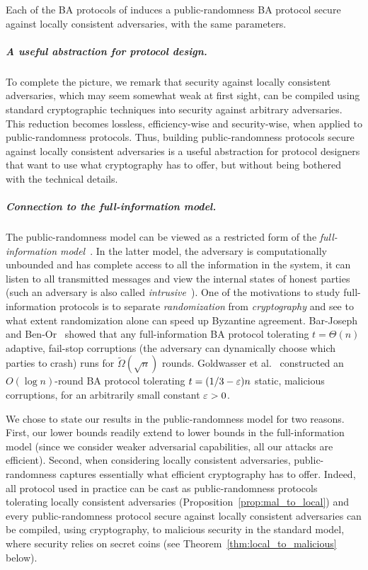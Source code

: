 \begin{proposition}\label{prop:mal_to_local}
Each of the BA protocols of \cite{FM97,FG03,KK06,Micali17,SM16,MV17,ADDNR19,ACDNPRS19} induces a public-randomness BA protocol secure against locally consistent adversaries, with the same parameters.
\end{proposition}


\subparagraph{A useful abstraction for protocol design.}
To complete the picture, we remark that security against locally consistent adversaries, which may seem somewhat weak at first sight, can be compiled using standard cryptographic techniques into security against arbitrary adversaries. This reduction becomes lossless, efficiency-wise and security-wise, when applied to public-randomness protocols. Thus, building public-randomness protocols secure against locally consistent adversaries is a useful abstraction for protocol designers that want to use what cryptography has to offer, but without being bothered with the technical details.

\subparagraph{Connection to the full-information model.}
The public-randomness model can be viewed as a restricted form of the \emph{full-information model}~\cite{CC84,BL85,GGL98,BB98,BPV06,GPV06,KKKSS08,Lewko11,KS13,LL13}. In the latter model, the adversary is computationally unbounded and has complete access to all the information in the system, \ie it can listen to all transmitted messages and view the internal states of honest parties (such an adversary is also called \emph{intrusive}~\cite{CC84}). One of the motivations to study full-information protocols is to separate \emph{randomization} from \emph{cryptography} and see to what extent randomization alone can speed up Byzantine agreement. Bar-Joseph and Ben-Or~\cite{BB98} showed that any full-information BA protocol tolerating $t=\Theta(n)$ adaptive, fail-stop corruptions (\ie the adversary can dynamically choose which parties to crash) runs for $\tilde \Omega(\sqrt{n})$ rounds. Goldwasser et al.~\cite{GPV06} constructed an $O(\log{n})$-round BA protocol tolerating $t=(1/3-\varepsilon)n$ static, malicious corruptions, for an arbitrarily small constant $\varepsilon>0$.

We chose to state our results in the public-randomness model for two reasons. First, our lower bounds readily extend to lower bounds in the full-information model (since we consider weaker adversarial capabilities, \eg all our attacks are efficient). Second, when considering locally consistent adversaries, public-randomness captures essentially what efficient cryptography has to offer. Indeed, all protocol used in practice can be cast as public-randomness protocols tolerating locally consistent adversaries (Proposition~\ref{prop:mal_to_local}) and every public-randomness protocol secure against locally consistent adversaries can be compiled, using cryptography, to malicious security in the standard model, where security relies on secret coins (see Theorem~\ref{thm:local_to_malicious} below).

